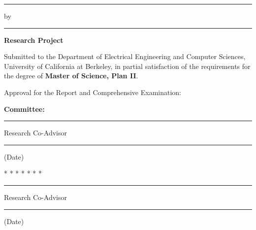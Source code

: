 \makeatletter
\thispagestyle{empty}

\begin{center}
\rule{6.5in}{0.40mm}

\vspace{0.1in}
    {\large \textbf{\@title} }

\vspace{0.1in}
    {\large by \@author }

\vspace{0.1in}
\rule{6.5in}{0.40mm}

\vspace{0.1in}
    {\large {\textbf{Research Project}}}
\end{center}

\noindent Submitted to the Department of Electrical Engineering and
Computer Sciences, University of California at Berkeley,
in partial satisfaction of the requirements for the degree
of \textbf{Master of Science, Plan II}.

\vspace{0.15in}
\noindent Approval for the Report and Comprehensive Examination:

\begin{center}
    \textbf{ Committee:}

\vspace{0.25in}
\rule{3.5in}{0.25mm}

\@chair

Research Co-Advisor

\vspace{0.25in}
\rule{3.5in}{0.25mm}

(Date)

\vspace{0.25in}
* * * * * * *

\vspace{0.25in}
\rule{3.5in}{0.25mm}

\@othermembers

Research Co-Advisor

\vspace{0.25in}
\rule{3.5in}{0.25mm}

(Date)
\end{center}
\makeatother
